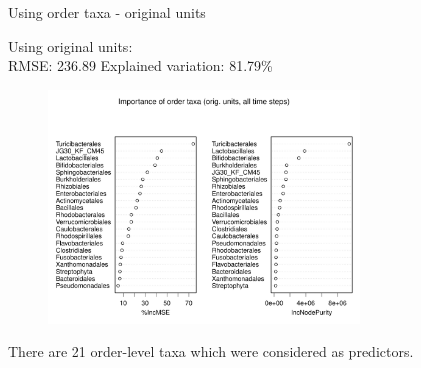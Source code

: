 \documentclass{beamer}
\begin{document}
\begin{frame}{Using order taxa - original units}
  
  {\scriptsize
    
  \noindent Using original units:\\
  RMSE: 236.89  \hspace{0.05in}  Explained variation: 81.79\%

  \begin{center}
    \begin{figure}
      \includegraphics[width=3.25in]{../only_orders/all_time_steps/orig_units_all_data_orders_imp_plot}
    \end{figure}
  \end{center}
  \vspace{-0.25in}

\noindent There are 21 order-level taxa which were considered as predictors.
}

\end{frame}
\end{document}
